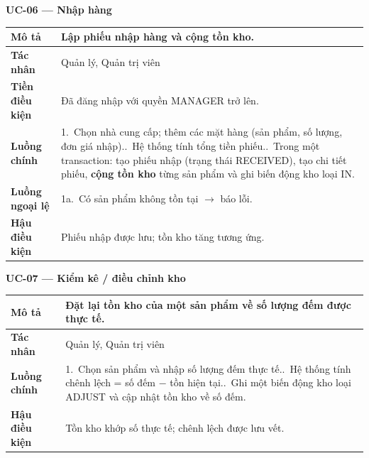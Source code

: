 \documentclass[12pt,a4paper]{report}
\newcommand{\ucfield}[1]{\textbf{#1}}
\begin{document}
\textbf{UC-06 --- Nhập hàng}
\begin{table}[H]\centering\small
\begin{tabularx}{\textwidth}{|L{3cm}|X|}
\hline
\ucfield{Mô tả} & Lập phiếu nhập hàng và cộng tồn kho. \\ \hline
\ucfield{Tác nhân} & Quản lý, Quản trị viên \\ \hline
\ucfield{Tiền điều kiện} & Đã đăng nhập với quyền MANAGER trở lên. \\ \hline
\ucfield{Luồng chính} &
1.~Chọn nhà cung cấp; thêm các mặt hàng (sản phẩm, số lượng, đơn giá nhập)..~Hệ thống tính tổng tiền phiếu..~Trong một transaction: tạo phiếu nhập (trạng thái RECEIVED), tạo chi tiết phiếu, \textbf{cộng tồn kho} từng sản phẩm và ghi biến động kho loại IN. \\ \hline
\ucfield{Luồng ngoại lệ} & 1a.~Có sản phẩm không tồn tại $\rightarrow$ báo lỗi. \\ \hline
\ucfield{Hậu điều kiện} & Phiếu nhập được lưu; tồn kho tăng tương ứng. \\ \hline
\end{tabularx}
\end{table}

\textbf{UC-07 --- Kiểm kê / điều chỉnh kho}
\begin{table}[H]\centering\small
\begin{tabularx}{\textwidth}{|L{3cm}|X|}
\hline
\ucfield{Mô tả} & Đặt lại tồn kho của một sản phẩm về số lượng đếm được thực tế. \\ \hline
\ucfield{Tác nhân} & Quản lý, Quản trị viên \\ \hline
\ucfield{Luồng chính} &
1.~Chọn sản phẩm và nhập số lượng đếm thực tế..~Hệ thống tính chênh lệch = số đếm $-$ tồn hiện tại..~Ghi một biến động kho loại ADJUST và cập nhật tồn kho về số đếm. \\ \hline
\ucfield{Hậu điều kiện} & Tồn kho khớp số thực tế; chênh lệch được lưu vết. \\ \hline
\end{tabularx}
\end{table}
\end{document}
